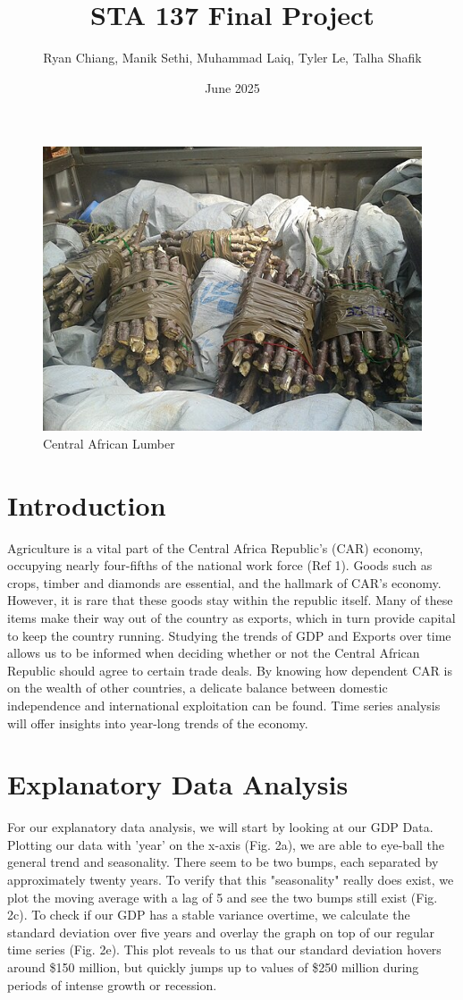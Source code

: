 \documentclass[11pt]{article}
\title{STA 137 Final Project}
\author{Ryan Chiang, Manik Sethi, Muhammad Laiq, Tyler Le, Talha Shafik}
\date{June 2025}
\begin{document}
\maketitle


\begin{figure}[H]
    \centering
    \includegraphics[width=0.3\linewidth]{central_africa_republic.jpg}
    \caption{Central African Lumber}
    \label{fig:enter-label}
\end{figure}




\tableofcontents

\newcommand{\numberedpart}[1]{%
    \part{#1}%
}

\section{Introduction}

Agriculture is a vital part of the Central Africa Republic's (CAR) economy, occupying nearly four-fifths of the national work force (Ref 1). Goods such as crops, timber and diamonds are essential, and the hallmark of CAR's economy. However, it is rare that these goods stay within the republic itself. Many of these items make their way out of the country as exports, which in turn provide capital to keep the country running.
Studying the trends of GDP and Exports over time allows us to be informed when deciding whether or not the Central African Republic should agree to certain trade deals. By knowing how dependent CAR is on the wealth of other countries, a delicate balance between domestic independence and international exploitation can be found. Time series analysis will offer insights into year-long trends of the economy.


\section{Explanatory Data Analysis}

For our explanatory data analysis, we will start by looking at our GDP Data. Plotting our data with 'year' on the x-axis (Fig. 2a), we are able to eye-ball the general trend and seasonality. There seem to be two bumps, each separated by approximately twenty years. To verify that this "seasonality" really does exist, we plot the moving average with a lag of 5 and see the two bumps still exist (Fig. 2c). To check if our GDP has a stable variance overtime, we calculate the standard deviation over five years and overlay the graph on top of our regular time series (Fig. 2e). This plot reveals to us that our standard deviation hovers around \$150 million, but quickly jumps up to values of \$250 million during periods of intense growth or recession.
\end{document}
